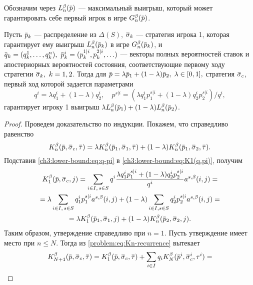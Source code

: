 {Обозначим через $\Low[n](\p)$ --- максимальный выигрыш, который может гарантировать себе первый игрок в игре $\theG(\p)$.
\begin{lemma}
  \label{ch3:lower-bound:lemma:convex-comb}
  Пусть $\p_k$ --- распределение из $\Delta(S)$, $\sigmav_k$ --- стратегия игрока 1, которая гарантирует ему выигрыш $\Low[n](\p_k)$ в игре $\theG[n](\p_k)$, и $\q_k = (q^1_k, \ldots, q^n_k),\ \p^i_k = ( p^{1|i}_k, p^{2|i}_k, \ldots)$ --- векторы полных вероятностей ставок и апостериорных вероятностей состояния, соответствующие первому ходу стратегии $\sigmav_k,\ k = 1,2$.
  Тогда для $\p = \lambda \p_1 + (1-\lambda) \p_2, \; \lambda \in [0, 1],$ стратегия $\sigmav_c$, первый ход которой задается параметрами
  \begin{equation}
    \label{ch3:lower-bound:eq:q-pi}
    q^i = \lambda q^i_1 + (1-\lambda) q^i_2, \quad
    p^{s|i} = \left(\lambda q^i_1 p^{s|i}_1 + (1-\lambda) q^i_2 p^{s|i}_2\right)/q^i,
  \end{equation}
  гарантирует игроку 1 выигрыш $\lambda \Low[n](\p_1) + (1-\lambda) \Low[n](\p_2)$.
\end{lemma}
\begin{proof}
  Проведем доказательство по индукции.
  Покажем, что справедливо равенство %
  \begin{equation}
    \label{ch3:lower-bound:lemma:convex-comb:eq:1}
    \K[n](\p, \sigmav_c, \tauv) =
    \lambda \K[n](\p_1, \sigmav_1, \tauv) +
    (1-\lambda)\K[n](\p_1, \sigmav_2, \tauv).
  \end{equation}
  Подставив \eqref{ch3:lower-bound:eq:q-pi} в \eqref{ch3:lower-bound:eq:K1(q,pi)}, получим
  \begin{gather*}
    \K[1](\p, \sigmav_c, j) = \sum_{i \in I, \, s \in S}
    q^i \frac{\lambda q^i_1 p^{s|i}_1 + (1-\lambda) q^i_2 p^{s|i}_2}{q^i} \as(i,j) = \\
    = \lambda \sum_{i \in I, \, s \in S} q^i_1 p^{s|i}_1 \as(i,j) +
    (1-\lambda) \sum_{i \in I, s \in S} q^i_2 p^{s|i}_2 \as(i, j) = \\
    = \lambda \K[1](\p_1, \sigmav_1, j) +
    (1-\lambda)\K(\p_2, \sigmav_2, j).
  \end{gather*}
  Таким образом, утверждение справедливо при $n = 1$.
  Пусть утверждение имеет место при $n \leqslant N$.
  Тогда из \eqref{problem:eq:Kn-recurrence} вытекает
  \begin{gather*}
    \K[N+1](\p, \sigmav_c, \tauv) =
    \K[1](\p, \sigmav_c, \tauv) +
    \sum_{i \in I} q_i \K[N](\p^i, \sigmav^i_c, \tau^i) = \\

\end{gather*}
\end{proof}}
